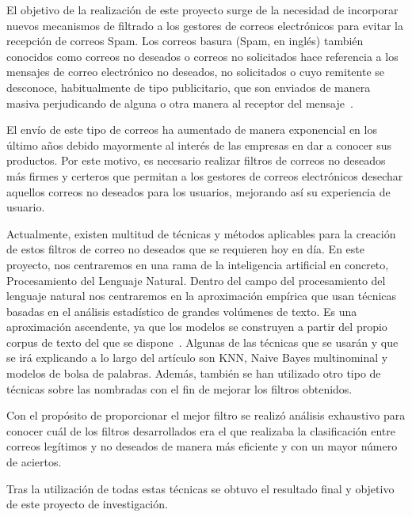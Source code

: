 \documentclass[conference,a4paper]{IEEEtran}
\begin{document}
El objetivo de la realización de este proyecto surge de la necesidad de incorporar nuevos mecanismos de filtrado a los gestores de correos electrónicos para evitar la recepción de correos Spam. Los correos basura (Spam, en inglés) también conocidos como correos no deseados o correos no solicitados hace referencia a los mensajes de correo electrónico no deseados, no solicitados o cuyo remitente se desconoce, habitualmente de tipo publicitario, que son enviados de manera masiva perjudicando de alguna o otra manera al receptor del mensaje~\cite{b1}.

El envío de este tipo de correos ha aumentado de manera exponencial en los último años debido mayormente al interés de las empresas en dar a conocer sus productos. Por este motivo, es necesario realizar filtros de correos no deseados más firmes y certeros que permitan a los gestores de correos electrónicos desechar aquellos correos no deseados para los usuarios, mejorando así su experiencia de usuario.

Actualmente, existen multitud de técnicas y métodos aplicables para la creación de estos  filtros  de correo no deseados que se requieren hoy en día. En este proyecto, nos centraremos en una rama de la inteligencia artificial en concreto, Procesamiento del Lenguaje Natural. Dentro del campo del procesamiento del lenguaje natural nos centraremos en la aproximación empírica que usan técnicas basadas en el análisis estadístico de
grandes volúmenes de texto. Es una aproximación ascendente, ya que los modelos
se construyen a partir del propio corpus de texto del que se dispone~\cite{b2}. Algunas de las técnicas que se usarán  y que se irá explicando a lo largo del artículo son KNN, Naive Bayes multinominal y modelos de bolsa de palabras. Además, también se han utilizado otro tipo de técnicas sobre las nombradas con el fin de mejorar los filtros obtenidos. 

Con el propósito de proporcionar el mejor filtro  se realizó análisis exhaustivo para conocer cuál de los filtros desarrollados era el que realizaba la clasificación entre correos legítimos y no deseados de manera más eficiente y con un mayor número de aciertos. 

Tras la utilización de todas estas técnicas se obtuvo el resultado final y objetivo de este proyecto de investigación.
\end{document}
